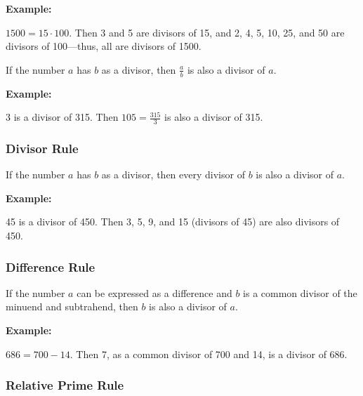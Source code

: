 \textbf{Example:}
\vspace{\baselineskip}

\( 1500 = 15 \cdot 100 \). Then 3 and 5 are divisors of 15, and 2, 4, 5, 10, 25, and 50 are divisors of 100—thus, all are divisors of 1500.


If the number \( a \) has \( b \) as a divisor, then \( \frac{a}{b} \) is also a divisor of \( a \). \\
\vspace{\baselineskip}

\textbf{Example:}
\vspace{\baselineskip}
 
3 is a divisor of 315. Then \( 105 = \frac{315}{3} \) is also a divisor of 315.

\subsubsection{Divisor Rule}

If the number \( a \) has \( b \) as a divisor, then every divisor of \( b \) is also a divisor of \( a \). \\
\vspace{\baselineskip}

\textbf{Example:}
\vspace{\baselineskip}
 
45 is a divisor of 450. Then 3, 5, 9, and 15 (divisors of 45) are also divisors of 450.

\subsubsection{Difference Rule}

If the number \( a \) can be expressed as a difference and \( b \) is a common divisor of the minuend and subtrahend, then \( b \) is also a divisor of \( a \). \\
\vspace{\baselineskip}

\textbf{Example:}
\vspace{\baselineskip}

\( 686 = 700 - 14 \). Then 7, as a common divisor of 700 and 14, is a divisor of 686.

\subsubsection{Relative Prime Rule}

